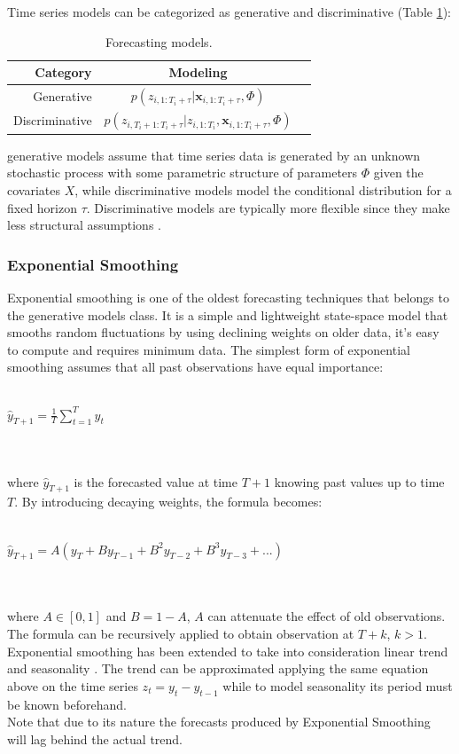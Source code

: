 \documentclass[a4paper, 12pt]{article} %
\newcommand{\ra}[1]{\renewcommand{\arraystretch}{#1}}
\begin{document}
	Time series models can be categorized as generative and discriminative \cite{DiscriminativeGenerativeModels} (Table \ref{table:generativediscriminative}):
	\begin{table}\centering 
		\ra{1.3}
		\begin{tabular}{@{}rcr@{}}\toprule
			Category & Modeling\\
			\midrule
			Generative & $p(z_{i,1:T_i+\tau} | \pmb{x}_{i, 1:T_i + \tau}, \Phi)$\\
			Discriminative &  $p(z_{i,T_{i}+1:T_i+\tau} | z_{i, 1:T_i}, \pmb{x}_{i, 1:T_i + \tau}, \Phi)$\\
			\bottomrule
		\end{tabular}
		\caption{Forecasting models.} \label{table:generativediscriminative}
	\end{table}
	generative models assume that time series data is generated by an unknown stochastic process with some parametric structure of parameters $\Phi$ given the covariates $X$, while discriminative models model the conditional distribution for a fixed horizon $\tau$. Discriminative models are typically more flexible since they make less structural assumptions \cite{GluonTS}.
	
	
	\subsubsection{Exponential Smoothing} \label{sssec:exponential_smoothing}
	Exponential smoothing \cite{ExponentialSmoothingHoltCharles} is one of the oldest forecasting techniques that belongs to the generative models class. It is a simple and lightweight state-space model that smooths random fluctuations by using declining weights on older data, it's easy to compute and requires minimum data.
	The simplest form of exponential smoothing assumes that all past observations have equal importance:\\\\
	\centerline{$\hat{y}_{T+1} = \frac{1}{T} \sum_{t=1}^{T}y_t$}\\\\
	where $\hat{y}_{T+1}$ is the forecasted value at time $T+1$ knowing past values up to time $T$. By introducing decaying weights, the formula becomes:\\\\
	\centerline{$\hat{y}_{T+1} = A(y_T + B y_{T-1} + B^2 y_{T-2} + B^3 y_{T-3} + ...)$ }\\\\
	where $A \in [0,1]$ and $B=1-A$, $A$ can attenuate the effect of old observations. The formula can be recursively applied to obtain observation at $T+k$, $k>1$. \\
	Exponential smoothing has been extended to take into consideration linear trend and seasonality \cite{ExponentialSmoothingHoltCharles}. The trend can be approximated applying the same equation above on the time series $z_t = y_t - y_{t-1}$ while to model seasonality its period must be known beforehand.\\
	Note that due to its nature the forecasts produced by Exponential Smoothing will lag behind the actual trend.
	
\end{document}
